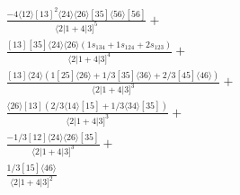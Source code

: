 \documentclass[varwidth, border=5pt]{standalone}
\begin{document}
\begin{my}
$\begin{gathered}
\scriptscriptstyle\frac{-4⟨12⟩[13]^2⟨24⟩⟨26⟩[35]⟨56⟩[56]}{⟨2|1+4|3]^5}+\\
\scriptscriptstyle\frac{[13][35]⟨24⟩⟨26⟩(1s_{134}+1s_{124}+2s_{123})}{⟨2|1+4|3]^4}+\\
\scriptscriptstyle\frac{[13]⟨24⟩(1[25]⟨26⟩+1/3[35]⟨36⟩+2/3[45]⟨46⟩)}{⟨2|1+4|3]^3}+\\
\scriptscriptstyle\frac{⟨26⟩[13](2/3⟨14⟩[15]+1/3⟨34⟩[35])}{⟨2|1+4|3]^3}+\\
\scriptscriptstyle\frac{-1/3[12]⟨24⟩⟨26⟩[35]}{⟨2|1+4|3]^3}+\\
\scriptscriptstyle\frac{1/3[15]⟨46⟩}{⟨2|1+4|3]^2}\phantom{+}
\end{gathered}$
\end{my}
\end{document}

